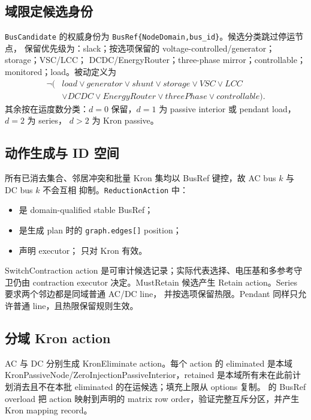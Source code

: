 \subsection{域限定候选身份}

\texttt{BusCandidate} 的权威身份为 \texttt{BusRef\{NodeDomain,bus\_id\}}。候选分类跳过停运节点，
保留优先级为：slack；按选项保留的 voltage-controlled/generator；storage；VSC/LCC；
DCDC/EnergyRouter；three-phase mirror；controllable；monitored；load。被动定义为
\begin{equation}
\begin{aligned}
\neg(&load\lor generator\lor shunt\lor storage\lor VSC\lor LCC\\
     &\lor DCDC\lor EnergyRouter\lor threePhase\lor controllable).
\end{aligned}
\end{equation}
其余按在运度数分类：$d=0$ 保留，$d=1$ 为 passive interior 或 pendant load，$d=2$ 为 series，
$d>2$ 为 Kron passive。

\subsection{动作生成与 ID 空间}

所有已消去集合、邻居冲突和批量 Kron 集均以 BusRef 键控，故 AC bus $k$ 与 DC bus $k$ 不会互相
抑制。\texttt{ReductionAction} 中：
\begin{itemize}
  \item {} 是 domain-qualified stable BusRef；
  \item {} 是生成 plan 时的 \texttt{graph.edges[]} position；
  \item {} 声明 executor； 只对 Kron 有效。
\end{itemize}

SwitchContraction action 是可审计候选记录；实际代表选择、电压基和多参考守卫仍由 contraction
executor 决定。MustRetain 候选产生 Retain action。Series 要求两个邻边都是同域普通 AC/DC line，
并按选项保留热限。Pendant 同样只允许普通 line，且热限保留规则生效。

\subsection{分域 Kron action}

AC 与 DC 分别生成 KronEliminate action。每个 action 的 eliminated 是本域
KronPassiveNode/ZeroInjectionPassiveInterior，retained 是本域所有未在此前计划消去且不在本批
eliminated 的在运候选；填充上限从 options 复制。 的 BusRef overload
把 action 映射到声明的 matrix row order，验证完整互斥分区，并产生 Kron mapping record。

